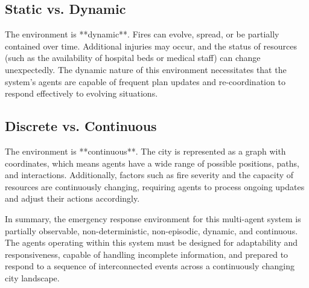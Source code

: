 \subsection{Static vs. Dynamic}

The environment is **dynamic**. Fires can evolve, spread, or be partially contained over time. Additional injuries may occur, and the status of resources
(such as the availability of hospital beds or medical staff) can change unexpectedly. The dynamic nature of this environment necessitates that the system's
agents are capable of frequent plan updates and re-coordination to respond effectively to evolving situations.

\subsection{Discrete vs. Continuous}

The environment is **continuous**. The city is represented as a graph with coordinates, which means agents have a wide range of possible positions,
paths, and interactions. Additionally, factors such as fire severity and the capacity of resources are continuously changing, requiring agents to
process ongoing updates and adjust their actions accordingly.


In summary, the emergency response environment for this multi-agent system is partially observable, non-deterministic, non-episodic, dynamic, and
continuous. The agents operating within this system must be designed for adaptability and responsiveness, capable of handling incomplete information,
and prepared to respond to a sequence of interconnected events across a continuously changing city landscape.
